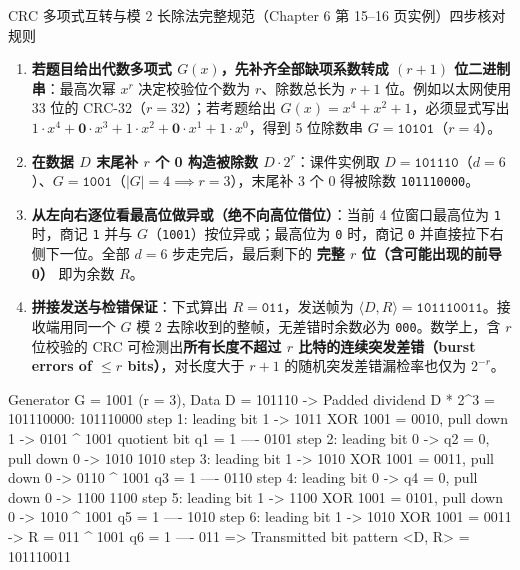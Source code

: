 \begin{StudyBlock}{CRC 多项式互转与模 2 长除法完整规范（Chapter 6 第 15–16 页实例）}{四步核对规则}
\begin{enumerate}
\item \textbf{若题目给出代数多项式 $G(x)$，先补齐全部缺项系数转成 $(r+1)$ 位二进制串}：最高次幂 $x^r$ 决定校验位个数为 $r$、除数总长为 $r+1$ 位。例如以太网使用 33 位的 CRC-32（$r=32$）；若考题给出 $G(x) = x^4 + x^2 + 1$，必须显式写出 $1\cdot x^4 + \mathbf{0}\cdot x^3 + 1\cdot x^2 + \mathbf{0}\cdot x^1 + 1\cdot x^0$，得到 5 位除数串 $G = \mathtt{10101}$（$r = 4$）。
\item \textbf{在数据 $D$ 末尾补 $r$ 个 0 构造被除数 $D\cdot 2^r$}：课件实例取 $D = \mathtt{101110}$（$d=6$）、$G = \mathtt{1001}$（$|G|=4 \implies r = 3$），末尾补 3 个 0 得被除数 \texttt{101110000}。
\item \textbf{从左向右逐位看最高位做异或（绝不向高位借位）}：当前 4 位窗口最高位为 \texttt{1} 时，商记 \texttt{1} 并与 $G$（\texttt{1001}）按位异或；最高位为 \texttt{0} 时，商记 \texttt{0} 并直接拉下右侧下一位。全部 $d=6$ 步走完后，最后剩下的 \textbf{完整 $r$ 位（含可能出现的前导 0）} 即为余数 $R$。
\item \textbf{拼接发送与检错保证}：下式算出 $R = \mathtt{011}$，发送帧为 $\langle D, R\rangle = \mathtt{101110011}$。接收端用同一个 $G$ 模 2 去除收到的整帧，无差错时余数必为 \texttt{000}。数学上，含 $r$ 位校验的 CRC 可检测出\textbf{所有长度不超过 $r$ 比特的连续突发差错（burst errors of $\le r$ bits）}，对长度大于 $r+1$ 的随机突发差错漏检率也仅为 $2^{-r}$。
\end{enumerate}
\end{StudyBlock}

\begin{StudyCode}
Generator G = 1001 (r = 3), Data D = 101110 -> Padded dividend D * 2^3 = 101110000:
  101110000   step 1: leading bit 1 -> 1011 XOR 1001 = 0010, pull down 1 -> 0101
^ 1001        quotient bit q1 = 1
  ----
   0101       step 2: leading bit 0 -> q2 = 0, pull down 0 -> 1010
    1010      step 3: leading bit 1 -> 1010 XOR 1001 = 0011, pull down 0 -> 0110
  ^ 1001      q3 = 1
    ----
     0110     step 4: leading bit 0 -> q4 = 0, pull down 0 -> 1100
      1100    step 5: leading bit 1 -> 1100 XOR 1001 = 0101, pull down 0 -> 1010
    ^ 1001    q5 = 1
      ----
       1010   step 6: leading bit 1 -> 1010 XOR 1001 = 0011 -> R = 011
     ^ 1001   q6 = 1
       ----
        011   => Transmitted bit pattern <D, R> = 101110011
\end{StudyCode}


